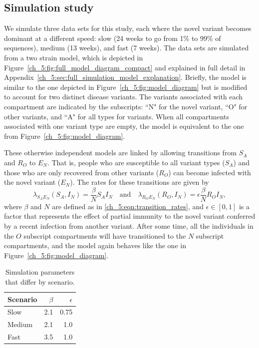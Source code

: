 \subsection{Simulation study}
\label{ch_5:subsec:simulation}

We simulate three data sets for this study, each where the novel variant becomes dominant at a different speed: slow (24 weeks to go from 1\% to 99\% of sequences), medium (13 weeks), and fast (7 weeks).
The data sets are simulated from a two strain model, which is depicted in Figure~\ref{ch_5:fig:full_model_diagram_compact} and explained in full detail in Appendix~\ref{ch_5:sec:full_simulation_model_explanation}.
Briefly, the model is similar to the one depicted in Figure~\ref{ch_5:fig:model_diagram} but is modified to account for two distinct disease variants.
The variants associated with each compartment are indicated by the subscripts: ``N" for the novel variant, ``O" for other variants, and ``A" for all types for variants.
When all compartments associated with one variant type are empty, the model is equivalent to the one from Figure~\ref{ch_5:fig:model_diagram}.

These otherwise independent models are linked by allowing transitions from \( S_A \) and \( R_O \) to \( E_N \).
That is, people who are susceptible to all variant types (\( S_A \)) and those who are only recovered from other variants (\( R_O \)) can become infected with the novel variant (\( E_N \)).
The rates for these transitions are given by
\begin{equation}
   \lambda_{{S_A}{E_N}}\left( S_A, I_N \right) = \frac{\beta}{N} S_A I_N \quad \textrm{and} \quad \lambda_{{R_O}{E_N}}\left( R_O, I_N \right) = \epsilon \frac{\beta}{N} R_O I_N,
\end{equation}
where \( \beta \) and \( N \) are defined as in \eqref{ch_5:eqn:transition_rates}, and \( \epsilon \in [0, 1] \) is a factor that represents the effect of partial immunity to the novel variant conferred by a recent infection from  another variant.
After some time, all the individuals in the \( O \) subscript compartments will have transitioned to the \( N \) subscript compartments, and the model again behaves like the one in Figure~\ref{ch_5:fig:model_diagram}.

\begin{table}
\caption{Simulation parameters that differ by scenario.}
\label{ch_5:table:scenario_differing_parameters}
\centering
\label{table}
\begin{tabular}{lrr}
Scenario & \( \beta \) & \( \epsilon \) \\ \hline
Slow     & 2.1         & 0.75           \\
Medium   & 2.1         & 1.0            \\
Fast     & 3.5         & 1.0            \\
\end{tabular}
\end{table}

